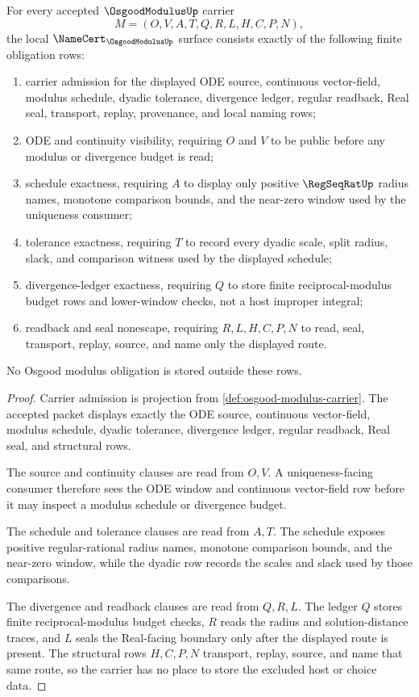 \begin{theorem}
\label{thm:osgood-modulus-namecert-obligations}
For every accepted $\OsgoodModulusUp$ carrier
$$
M=(O,V,A,T,Q,R,L,H,C,P,N),
$$
the local $\NameCert_{\OsgoodModulusUp}$ surface consists exactly of the following finite obligation rows:
\begin{enumerate}
\item carrier admission for the displayed ODE source, continuous vector-field, modulus schedule, dyadic tolerance, divergence ledger, regular readback, Real seal, transport, replay, provenance, and local naming rows;
\item ODE and continuity visibility, requiring $O$ and $V$ to be public before any modulus or divergence budget is read;
\item schedule exactness, requiring $A$ to display only positive $\RegSeqRatUp$ radius names, monotone comparison bounds, and the near-zero window used by the uniqueness consumer;
\item tolerance exactness, requiring $T$ to record every dyadic scale, split radius, slack, and comparison witness used by the displayed schedule;
\item divergence-ledger exactness, requiring $Q$ to store finite reciprocal-modulus budget rows and lower-window checks, not a host improper integral;
\item readback and seal nonescape, requiring $R,L,H,C,P,N$ to read, seal, transport, replay, source, and name only the displayed route.
\end{enumerate}
No Osgood modulus obligation is stored outside these rows.
\end{theorem}
\begin{proof}
Carrier admission is projection from \autoref{def:osgood-modulus-carrier}. The accepted packet displays exactly the ODE source, continuous vector-field, modulus schedule, dyadic tolerance, divergence ledger, regular readback, Real seal, and structural rows.

The source and continuity clauses are read from $O,V$. A uniqueness-facing consumer therefore sees the ODE window and continuous vector-field row before it may inspect a modulus schedule or divergence budget.

The schedule and tolerance clauses are read from $A,T$. The schedule exposes positive regular-rational radius names, monotone comparison bounds, and the near-zero window, while the dyadic row records the scales and slack used by those comparisons.

The divergence and readback clauses are read from $Q,R,L$. The ledger $Q$ stores finite reciprocal-modulus budget checks, $R$ reads the radius and solution-distance traces, and $L$ seals the Real-facing boundary only after the displayed route is present. The structural rows $H,C,P,N$ transport, replay, source, and name that same route, so the carrier has no place to store the excluded host or choice data.
\end{proof}

